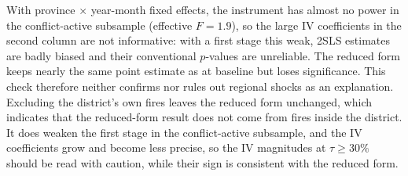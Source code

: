 \documentclass[12pt]{article}
\begin{document}
With province $\times$ year-month fixed effects, the instrument has almost no power in the conflict-active subsample (effective $F = 1.9$), so the large IV coefficients in the second column are not informative: with a first stage this weak, 2SLS estimates are badly biased and their conventional $p$-values are unreliable. The reduced form keeps nearly the same point estimate as at baseline but loses significance. This check therefore neither confirms nor rules out regional shocks as an explanation. Excluding the district's own fires leaves the reduced form unchanged, which indicates that the reduced-form result does not come from fires inside the district. It does weaken the first stage in the conflict-active subsample, and the IV coefficients grow and become less precise, so the IV magnitudes at $\tau \geq 30\%$ should be read with caution, while their sign is consistent with the reduced form.



\end{document}
